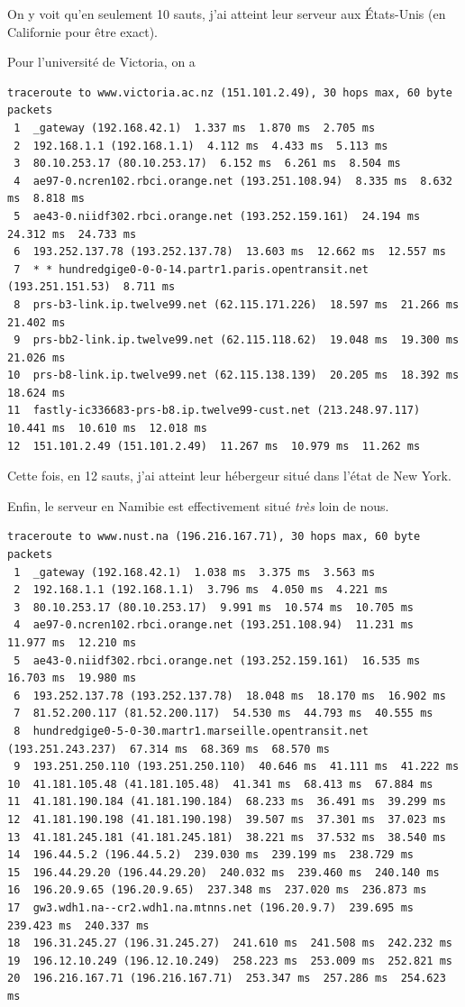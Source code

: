 \documentclass[a4paper,10pt]{article}
\begin{document}
On y voit qu'en seulement 10 sauts, j'ai atteint leur serveur aux États-Unis (en Californie pour être exact).

Pour l'université de Victoria, on a

\begin{lstlisting}[basicstyle=\tiny]
traceroute to www.victoria.ac.nz (151.101.2.49), 30 hops max, 60 byte packets
 1  _gateway (192.168.42.1)  1.337 ms  1.870 ms  2.705 ms
 2  192.168.1.1 (192.168.1.1)  4.112 ms  4.433 ms  5.113 ms
 3  80.10.253.17 (80.10.253.17)  6.152 ms  6.261 ms  8.504 ms
 4  ae97-0.ncren102.rbci.orange.net (193.251.108.94)  8.335 ms  8.632 ms  8.818 ms
 5  ae43-0.niidf302.rbci.orange.net (193.252.159.161)  24.194 ms  24.312 ms  24.733 ms
 6  193.252.137.78 (193.252.137.78)  13.603 ms  12.662 ms  12.557 ms
 7  * * hundredgige0-0-0-14.partr1.paris.opentransit.net (193.251.151.53)  8.711 ms
 8  prs-b3-link.ip.twelve99.net (62.115.171.226)  18.597 ms  21.266 ms  21.402 ms
 9  prs-bb2-link.ip.twelve99.net (62.115.118.62)  19.048 ms  19.300 ms  21.026 ms
10  prs-b8-link.ip.twelve99.net (62.115.138.139)  20.205 ms  18.392 ms  18.624 ms
11  fastly-ic336683-prs-b8.ip.twelve99-cust.net (213.248.97.117)  10.441 ms  10.610 ms  12.018 ms
12  151.101.2.49 (151.101.2.49)  11.267 ms  10.979 ms  11.262 ms
\end{lstlisting}

Cette fois, en 12 sauts, j'ai atteint leur hébergeur situé dans l'état de New York.

Enfin, le serveur en Namibie est effectivement situé \textit{très} loin de nous.
\begin{lstlisting}[basicstyle=\tiny]
traceroute to www.nust.na (196.216.167.71), 30 hops max, 60 byte packets
 1  _gateway (192.168.42.1)  1.038 ms  3.375 ms  3.563 ms
 2  192.168.1.1 (192.168.1.1)  3.796 ms  4.050 ms  4.221 ms
 3  80.10.253.17 (80.10.253.17)  9.991 ms  10.574 ms  10.705 ms
 4  ae97-0.ncren102.rbci.orange.net (193.251.108.94)  11.231 ms  11.977 ms  12.210 ms
 5  ae43-0.niidf302.rbci.orange.net (193.252.159.161)  16.535 ms  16.703 ms  19.980 ms
 6  193.252.137.78 (193.252.137.78)  18.048 ms  18.170 ms  16.902 ms
 7  81.52.200.117 (81.52.200.117)  54.530 ms  44.793 ms  40.555 ms
 8  hundredgige0-5-0-30.martr1.marseille.opentransit.net (193.251.243.237)  67.314 ms  68.369 ms  68.570 ms
 9  193.251.250.110 (193.251.250.110)  40.646 ms  41.111 ms  41.222 ms
10  41.181.105.48 (41.181.105.48)  41.341 ms  68.413 ms  67.884 ms
11  41.181.190.184 (41.181.190.184)  68.233 ms  36.491 ms  39.299 ms
12  41.181.190.198 (41.181.190.198)  39.507 ms  37.301 ms  37.023 ms
13  41.181.245.181 (41.181.245.181)  38.221 ms  37.532 ms  38.540 ms
14  196.44.5.2 (196.44.5.2)  239.030 ms  239.199 ms  238.729 ms
15  196.44.29.20 (196.44.29.20)  240.032 ms  239.460 ms  240.140 ms
16  196.20.9.65 (196.20.9.65)  237.348 ms  237.020 ms  236.873 ms
17  gw3.wdh1.na--cr2.wdh1.na.mtnns.net (196.20.9.7)  239.695 ms  239.423 ms  240.337 ms
18  196.31.245.27 (196.31.245.27)  241.610 ms  241.508 ms  242.232 ms
19  196.12.10.249 (196.12.10.249)  258.223 ms  253.009 ms  252.821 ms
20  196.216.167.71 (196.216.167.71)  253.347 ms  257.286 ms  254.623 ms
\end{lstlisting}
\end{document}
